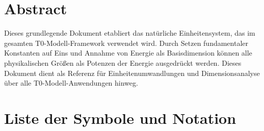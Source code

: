 \section*{Abstract}
		Dieses grundlegende Dokument etabliert das natürliche Einheitensystem, das im gesamten T0-Modell-Framework verwendet wird. Durch Setzen fundamentaler Konstanten auf Eins und Annahme von Energie als Basisdimension können alle physikalischen Größen als Potenzen der Energie ausgedrückt werden. Dieses Dokument dient als Referenz für Einheitenumwandlungen und Dimensionsanalyse über alle T0-Modell-Anwendungen hinweg.

	
	
	\section{Liste der Symbole und Notation}
	
